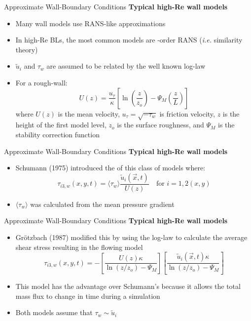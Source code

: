 \begin{frame}{Approximate Wall-Boundary Conditions}
\textbf{Typical high-Re wall models}
\begin{itemize}
	\item Many wall models use RANS-like approximations
	\item In high-Re BLs, the most common models are -order RANS (\textit{i.e.} similarity theory)
	\item $\tilde{u}_i$ and $\tau_w$ are assumed to be related by the well known log-law
	\item For a rough-wall:
	$$U(z) = \frac{u_\tau}{\kappa} \left[\ln \left(\frac{z}{z_o}\right) - \Psi_M\left(\frac{z}{L}\right)\right]$$
	where $U(z)$ is the mean velocity, $u_\tau = \sqrt{-\tau_w}$ is friction velocity, $z$ is the height of the first model level, $z_o$ is the surface roughness, and $\Psi_M$ is the stability correction function
\end{itemize}

\end{frame}
\begin{frame}{Approximate Wall-Boundary Conditions}
\textbf{Typical high-Re wall models}
\begin{itemize}
	\item Schumann (1975) introduced the \newline of this class of models where:
	$$\tau_{i3,w}(x,y,t) = \langle \tau_w \rangle \frac{\tilde{u}_i(\vec{x},t)}{U(z)} \quad \text{for $i=1,2 (x,y)$} $$
	\item $\langle \tau_w \rangle$ was calculated from the mean pressure gradient
\end{itemize}

\end{frame}
\begin{frame}{Approximate Wall-Boundary Conditions}
\textbf{Typical high-Re wall models}
\begin{itemize}
	\item Gr{\"o}tzbach (1987) modified this by using the log-law to calculate the average shear stress resulting in the flowing model
	$$\tau_{i3,w}(x,y,t) = - \left[\frac{U(z)\kappa}{\ln(z/z_o) - \Psi_M}\right] \left[\frac{\tilde{u}_i(\vec{x},t) \kappa}{\ln(z/z_o) - \Psi_M}\right]$$
	\item This model has the advantage over Schumann's because it allows the total mass flux to change in time during a simulation
	\item Both models assume that $\tau_w \sim \tilde{u}_i$
\end{itemize}

\end{frame}
